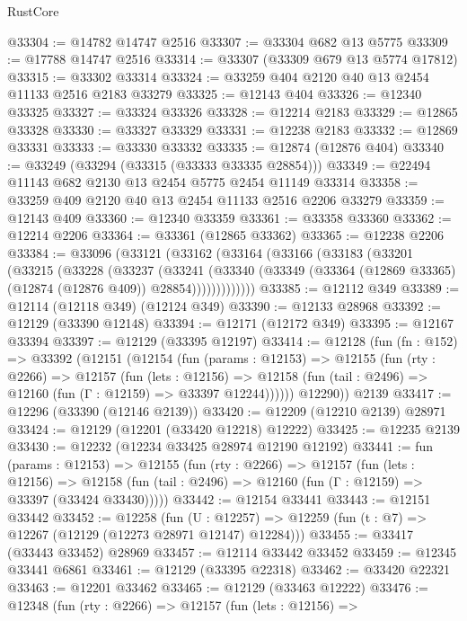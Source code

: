 \begin{lexlean}{RustCore}
\begin{coremodule}
@33304 := @14782 @14747 @2516
@33307 := @33304 @682 @13 @5775
@33309 := @17788 @14747 @2516
@33314 := @33307 (@33309 @679 @13 @5774 @17812)
@33315 := @33302 @33314
@33324 := @33259 @404 @2120 @40 @13 @2454 @11133 @2516 @2183 @33279
@33325 := @12143 @404
@33326 := @12340 @33325
@33327 := @33324 @33326
@33328 := @12214 @2183
@33329 := @12865 @33328
@33330 := @33327 @33329
@33331 := @12238 @2183
@33332 := @12869 @33331
@33333 := @33330 @33332
@33335 := @12874 (@12876 @404)
@33340 := @33249 (@33294 (@33315 (@33333 @33335 @28854)))
@33349 := @22494 @11143 @682 @2130 @13 @2454 @5775 @2454 @11149 @33314
@33358 := @33259 @409 @2120 @40 @13 @2454 @11133 @2516 @2206 @33279
@33359 := @12143 @409
@33360 := @12340 @33359
@33361 := @33358 @33360
@33362 := @12214 @2206
@33364 := @33361 (@12865 @33362)
@33365 := @12238 @2206
@33384 := @33096
    (@33121
      (@33162
        (@33164
          (@33166
            (@33183
              (@33201
                (@33215
                  (@33228
                    (@33237
                      (@33241
                        (@33340
                          (@33349 (@33364 (@12869 @33365) (@12874 (@12876 @409)) @28854)))))))))))))
@33385 := @12112 @349
@33389 := @12114 (@12118 @349) (@12124 @349)
@33390 := @12133 @28968
@33392 := @12129 (@33390 @12148)
@33394 := @12171 (@12172 @349)
@33395 := @12167 @33394
@33397 := @12129 (@33395 @12197)
@33414 := @12128
    (fun (fn : @152) =>
    @33392
      (@12151
        (@12154
          (fun (params : @12153) =>
          @12155
            (fun (rty : @2266) =>
            @12157
              (fun (lets : @12156) =>
              @12158 (fun (tail : @2496) => @12160 (fun (Γ : @12159) => @33397 @12244))))))
        @12290))
    @2139
@33417 := @12296 (@33390 (@12146 @2139))
@33420 := @12209 (@12210 @2139) @28971
@33424 := @12129 (@12201 (@33420 @12218) @12222)
@33425 := @12235 @2139
@33430 := @12232 (@12234 @33425 @28974 @12190 @12192)
@33441 := fun (params : @12153) =>
  @12155
    (fun (rty : @2266) =>
    @12157
      (fun (lets : @12156) =>
      @12158 (fun (tail : @2496) => @12160 (fun (Γ : @12159) => @33397 (@33424 @33430)))))
@33442 := @12154 @33441
@33443 := @12151 @33442
@33452 := @12258
    (fun (U : @12257) => @12259 (fun (t : @7) => @12267 (@12129 (@12273 @28971 @12147) @12284)))
@33455 := @33417 (@33443 @33452) @28969
@33457 := @12114 @33442 @33452
@33459 := @12345 @33441 @6861
@33461 := @12129 (@33395 @22318)
@33462 := @33420 @22321
@33463 := @12201 @33462
@33465 := @12129 (@33463 @12222)
@33476 := @12348
    (fun (rty : @2266) =>
    @12157
      (fun (lets : @12156) =>

\end{coremodule}
\end{lexlean}
